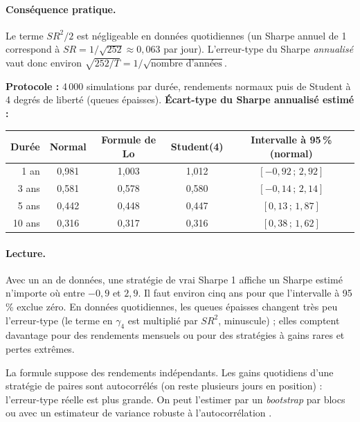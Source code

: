 \paragraph{Conséquence pratique.} Le terme $SR^2/2$ est négligeable en données quotidiennes (un Sharpe annuel de 1 correspond à $SR = 1/\sqrt{252} \approx 0{,}063$ par jour). L'erreur-type du Sharpe \emph{annualisé} vaut donc environ $\sqrt{252/T} = 1/\sqrt{\text{nombre d'années}}$.

\begin{codebox}
\textbf{Protocole :} 4\,000 simulations par durée, rendements normaux puis de Student à 4 degrés de liberté (queues épaisses). \textbf{Écart-type du Sharpe annualisé estimé :}
\begin{center}\small
\begin{tabular}{rcccc}
\toprule
Durée & Normal & Formule de Lo & Student(4) & Intervalle à 95\,\% (normal) \\
\midrule
1 an & 0,981 & 1,003 & 1,012 & $[-0{,}92\,;\,2{,}92]$ \\
3 ans & 0,581 & 0,578 & 0,580 & $[-0{,}14\,;\,2{,}14]$ \\
5 ans & 0,442 & 0,448 & 0,447 & $[0{,}13\,;\,1{,}87]$ \\
10 ans & 0,316 & 0,317 & 0,316 & $[0{,}38\,;\,1{,}62]$ \\
\bottomrule
\end{tabular}
\end{center}
\end{codebox}

\paragraph{Lecture.} Avec un an de données, une stratégie de vrai Sharpe 1 affiche un Sharpe estimé n'importe où entre $-0{,}9$ et $2{,}9$. Il faut environ cinq ans pour que l'intervalle à 95\,\% exclue zéro. En données quotidiennes, les queues épaisses changent très peu l'erreur-type (le terme en $\gamma_4$ est multiplié par $SR^2$, minuscule) ; elles comptent davantage pour des rendements mensuels ou pour des stratégies à gains rares et pertes extrêmes.

\begin{pitfall}
La formule suppose des rendements indépendants. Les gains quotidiens d'une stratégie de paires sont autocorrélés (on reste plusieurs jours en position) : l'erreur-type réelle est plus grande. On peut l'estimer par un \emph{bootstrap} par blocs ou avec un estimateur de variance robuste à l'autocorrélation \citep{neweywest1987}.
\end{pitfall}

